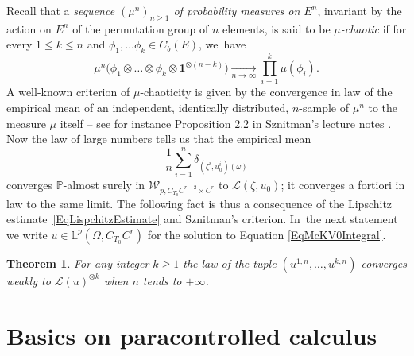 \documentclass[JEP,XML,SOM,Unicode,published]{cedram}
\newtheorem{thm}{Theorem}
\theoremstyle{definition}
\newcommand{\bfone}{\mathbf{1}}
\newcommand{\mcL}{\mathcal{L}}
\newcommand\mcW{\mathcal W}
\newcommand{\bbL}{\mathbb{L}}
\begin{document}
Recall that a \textit{sequence $(\mu^n)_{n\geq 1}$ of probability measures on $E^n$}, invariant by the action on $E^n$ of the permutation group of $n$ elements, is said to be \textit{$\mu$-chaotic} if for every $1\leq k\leq n$ and $\phi_1,\dots\phi_k\in C_b(E)$, we~have
\[
\mu^n\bigl(\phi_1 \otimes \dots \otimes \phi_k \otimes \bfone^{\otimes (n-k)} \bigr) \underset{n\to\infty}{\to} \prod_{i=1}^k \mu(\phi_i).
\]
A well-known criterion of $\mu$-chaoticity is given by the convergence in law of the empirical mean of an independent, identically distributed, $n$-sample of $\mu^n$ to the measure $\mu$ itself -- see for instance Proposition 2.2 in Sznitman's lecture notes \cite{Snitzman89}. Now the law of large numbers tells us that the empirical mean
\[
\frac{1}{n}\sum_{i=1}^n \delta_{(\zeta^i,u_0^i)(\omega)}
\]
converges $\mathbb{P}$-almost surely in $\mcW_{p,C_{T_0}C^{r-2}\times C^r}$ to $\mcL(\zeta,u_0)$; it converges a fortiori in law to the same limit. The following fact is thus a consequence of the Lipschitz estimate~\eqref{EqLispchitzEstimate} and Sznitman's criterion. In~the next statement we write $u\in \bbL^p(\Omega, C_{T_0}C^r)$ for the solution to Equation \eqref{EqMcKV0Integral}.

\begin{thm}
For any integer $k\geq 1$ the law of the tuple $(u^{1,n},\dots, u^{k,n})$ converges weakly to $\mcL(u)^{\otimes k}$ when $n $ tends to $+\infty$.
\end{thm}

\section{Basics on paracontrolled calculus}
\label{SectionBasics}
\end{document}
